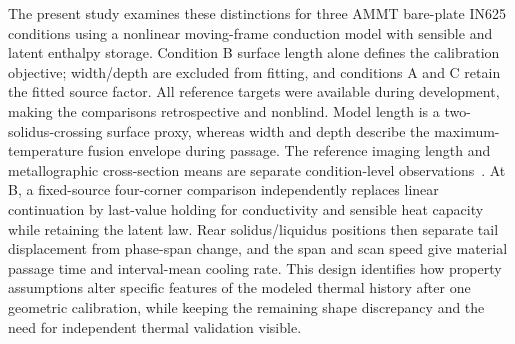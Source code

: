 The present study examines these distinctions for three AMMT bare-plate IN625 conditions using a nonlinear moving-frame conduction model with sensible and latent enthalpy storage. Condition B surface length alone defines the calibration objective; width/depth are excluded from fitting, and conditions A and C retain the fitted source factor. All reference targets were available during development, making the comparisons retrospective and nonblind. Model length is a two-solidus-crossing surface proxy, whereas width and depth describe the maximum-temperature fusion envelope during passage. The reference imaging length and metallographic cross-section means are separate condition-level observations~\cite{lane2020,nist2018}. At B, a fixed-source four-corner comparison independently replaces linear continuation by last-value holding for conductivity and sensible heat capacity while retaining the latent law. Rear solidus/liquidus positions then separate tail displacement from phase-span change, and the span and scan speed give material passage time and interval-mean cooling rate. This design identifies how property assumptions alter specific features of the modeled thermal history after one geometric calibration, while keeping the remaining shape discrepancy and the need for independent thermal validation visible.
